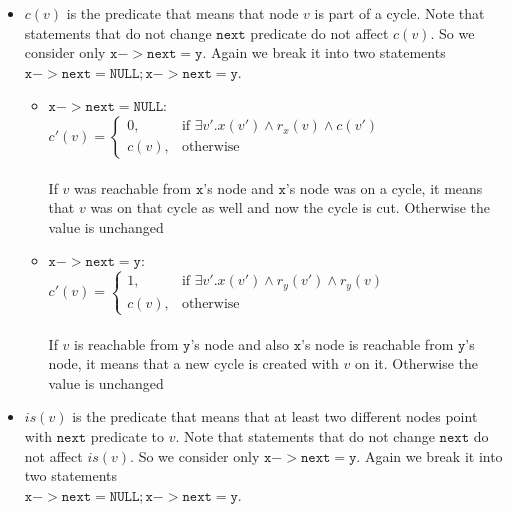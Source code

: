 \begin{itemize}
\begin{itemize}
\end{itemize}
\item $c(v)$ is the predicate that means that node $v$ is part of a cycle. Note that statements that do not change $\mathtt{next}$ predicate do not affect $c(v)$. So we consider only $\mathtt{x->next=y}$. Again we break it into two statements\\ $\mathtt{x->next=NULL; x->next=y}$.
\begin{itemize}
	\item $\mathtt{x->next=NULL}$:\\
	$c'(v)=\begin{cases}
	0, & \text{if } \exists v'.x(v')\land r_x(v)\land c(v') \\
	c(v), & \text{otherwise}
	\end{cases}$\\ \\
	If $v$ was reachable from $\mathtt{x}$'s node and $\mathtt{x}$'s node was on a cycle, it means that $v$ was on that cycle as well and now the cycle is cut. Otherwise the value is unchanged \\
	\item $\mathtt{x->next=y}$:\\
	$c'(v)=\begin{cases}
	1, & \text{if } \exists v'.x(v')\land r_y(v')\land r_y(v) \\
	c(v), & \text{otherwise}
	\end{cases}$\\ \\
	If $v$ is reachable from $\mathtt{y}$'s node and also $\mathtt{x}$'s node is reachable from $\mathtt{y}$'s node, it means that a new cycle is created with $v$ on it. Otherwise the value is unchanged \\
\end{itemize}
\item $is(v)$ is the predicate that means that at least two different nodes point with $\mathtt{next}$ predicate to $v$. Note that statements that do not change $\mathtt{next}$ do not affect $is(v)$. So we consider only $\mathtt{x->next=y}$. Again we break it into two statements\\ $\mathtt{x->next=NULL; x->next=y}$.
\end{itemize}
